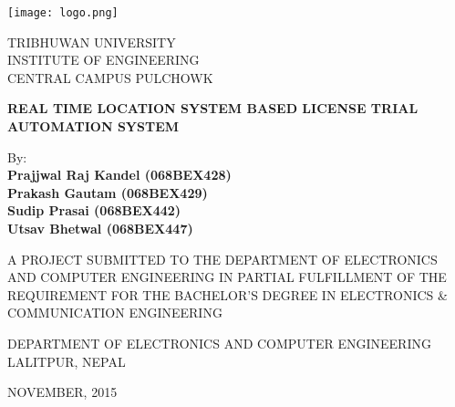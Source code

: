 \documentclass[a4paper,12pt]{article}
\begin{document}
% 

\begin{titlepage}
	\begin{center}
\texttt{[image: logo.png]}\\
\bf{
TRIBHUWAN UNIVERSITY\\
INSTITUTE OF ENGINEERING\\
CENTRAL CAMPUS PULCHOWK\\


\begin{spacing}{3}
\end{spacing}
\textbf{REAL TIME LOCATION SYSTEM BASED LICENSE TRIAL AUTOMATION SYSTEM}\\

\begin{spacing}{3}
\end{spacing}

By:\\
\textbf{Prajjwal Raj Kandel (068BEX428)\\
Prakash Gautam (068BEX429)\\
Sudip Prasai (068BEX442)\\
Utsav Bhetwal (068BEX447)}\\

\begin{spacing}{4}
\end{spacing}

A PROJECT SUBMITTED TO THE DEPARTMENT OF ELECTRONICS AND
COMPUTER ENGINEERING IN PARTIAL FULFILLMENT OF THE REQUIREMENT
FOR THE BACHELOR'S DEGREE IN ELECTRONICS \& COMMUNICATION
ENGINEERING

\begin{spacing}{4}
\end{spacing}

DEPARTMENT OF ELECTRONICS AND COMPUTER ENGINEERING\\
LALITPUR, NEPAL

\begin{spacing}{2}
\end{spacing}
NOVEMBER, 2015
}
\end{center}
\end{titlepage}
\end{document}
